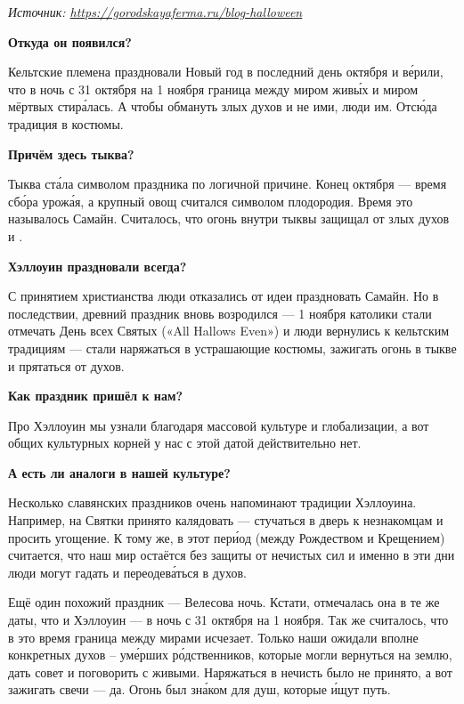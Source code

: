 \textit{Источник: \url{https://gorodskayaferma.ru/blog-halloween}}



\textbf{Откуда он появился?}

Кельтские племена праздновали Новый год в последний день октября и в\'{е}рили, что в ночь с 31 октября на 1 ноября граница между миром жив\'{ы}х и миром мёртвых стир\'{а}лась. А чтобы обмануть злых духов и не  ими, люди  им. Отс\'{ю}да традиция  в  костюмы.

\textbf{Причём здесь тыква?}

Тыква ст\'{а}ла символом праздника по логичной причине. Конец октября --- время сб\'{о}ра урож\'{а}я, а крупный овощ считался символом плодородия. Время это называлось Самайн. Считалось, что огонь внутри тыквы защищал от злых духов и   .

\textbf{Хэллоуин праздновали всегда?}

С принятием христианства люди отказались от идеи праздновать Самайн. Но в последствии, древний праздник вновь возродился — 1 ноября католики стали отмечать День всех Святых («All Hallows Even») и люди вернулись к кельтским традициям — стали наряжаться в устрашающие костюмы, зажигать огонь в тыкве и прятаться от духов.

\textbf{Как праздник пришёл к нам?}

Про Хэллоуин мы узнали благодаря массовой культуре и глобализации, а вот общих культурных корней у нас с этой датой действительно нет.

\textbf{А есть ли аналоги в нашей культуре?}

Несколько славянских праздников очень напоминают традиции Хэллоуина. Например, на Святки принято калядовать — стучаться в дверь к незнакомцам и просить угощение. К тому же, в этот пер\'{и}од (между Рождеством и Крещением) считается, что наш мир остаётся без защиты от нечистых сил и именно в эти дни люди могут гадать и переодев\'{а}ться в духов.

Ещё один похожий праздник — Велесова ночь. Кстати, отмечалась она в те же даты, что и Хэллоуин — в ночь с 31 октября на 1 ноября. Так же считалось, что в это время граница между мирами исчезает. Только наши  ожидали вполне конкретных духов -- ум\'{е}рших р\'{о}дственников, которые могли вернуться на землю, дать совет и поговорить с живыми. Наряжаться в нечисть было не принято, а вот зажигать свечи — да. Огонь был зн\'{а}ком для душ, которые \'{и}щут путь.

